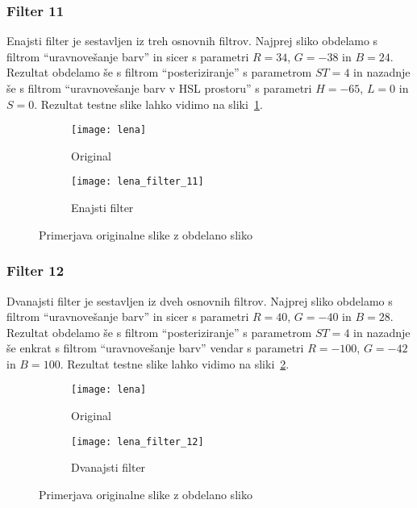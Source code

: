 \subsubsection*{Filter 11}
Enajsti filter je sestavljen iz treh osnovnih filtrov. Najprej sliko obdelamo s
filtrom ``uravnovešanje barv'' in sicer s parametri $R = 34$, $G = -38$ in
$B = 24$. Rezultat obdelamo še s filtrom ``posteriziranje'' s parametrom
$ST= 4$ in nazadnje še s filtrom ``uravnovešanje barv v HSL prostoru'' s
parametri $H = -65$, $L = 0$ in $S = 0$. Rezultat testne slike lahko
vidimo na sliki~\ref{fig:lena_filter_11}.

\begin{figure}[h]
    \centering
    \begin{subfigure}[b]{0.4\textwidth}
        \texttt{[image: lena]}
        \caption{Original}
    \end{subfigure}
    \begin{subfigure}[b]{0.4\textwidth}
        \texttt{[image: lena\_filter\_11]}
        \caption{Enajsti filter}
    \end{subfigure}
    \caption{Primerjava originalne slike z obdelano sliko}
    \label{fig:lena_filter_11}
\end{figure}


\subsubsection*{Filter 12}
Dvanajsti filter je sestavljen iz dveh osnovnih filtrov. Najprej sliko obdelamo s
filtrom ``uravnovešanje barv'' in sicer s parametri $R = 40$, $G = -40$ in
$B = 28$. Rezultat obdelamo še s filtrom ``posteriziranje'' s parametrom
$ST= 4$ in nazadnje še enkrat s filtrom ``uravnovešanje barv'' vendar s
parametri $R = -100$, $G = -42$ in $B = 100$. Rezultat testne slike lahko
vidimo na sliki~\ref{fig:lena_filter_12}.

\begin{figure}[h]
    \centering
    \begin{subfigure}[b]{0.4\textwidth}
        \texttt{[image: lena]}
        \caption{Original}
    \end{subfigure}
    \begin{subfigure}[b]{0.4\textwidth}
        \texttt{[image: lena\_filter\_12]}
        \caption{Dvanajsti filter}
    \end{subfigure}
    \caption{Primerjava originalne slike z obdelano sliko}
    \label{fig:lena_filter_12}
\end{figure}


